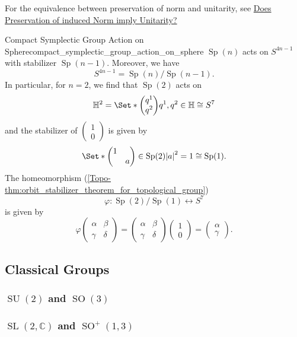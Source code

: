 \documentclass{article}
\begin{document}
For the equivalence between preservation of norm and unitarity, see \href{https://math.stackexchange.com/questions/3313702/does-preservation-of-induced-norm-imply-unitarity}{Does Preservation of induced Norm imply Unitarity?}

\begin{example}{Compact Symplectic Group Action on Sphere}{compact_symplectic_group_action_on_sphere}
    $\operatorname{Sp}(n)$ acts on $S^{4n-1}$ with stabilizer $\operatorname{Sp}(n-1)$.
    Moreover, we have
    \[ S^{4n-1} = \operatorname{Sp}(n)/\operatorname{Sp}(n-1). \]
    In particular, for $n=2$, we find that $\operatorname{Sp}(2)$ acts on
    \[ \mathbb{H}^2 = \Set*{\begin{pmatrix}
        q^1 \\ q^2
    \end{pmatrix}}{q^1,q^2\in\mathbb{H}} \cong S^7 \]
    and the stabilizer of $\begin{pmatrix}
        1 \\ 0
    \end{pmatrix}$ is given by
    \[ \Set*{\begin{pmatrix}
        1 & \\ & a
    \end{pmatrix}\in\operatorname{Sp}(2)}{\abs{a}^2 = 1} \cong \operatorname{Sp}(1). \]
    The homeomorphism (\cref{Topo-thm:orbit_stabilizer_theorem_for_topological_group})
    \[ \varphi: \operatorname{Sp}(2)/\operatorname{Sp}(1) \longleftrightarrow S^7 \]
    is given by
    \[ \varphi\begin{pmatrix}
        \alpha & \beta \\ \gamma & \delta
    \end{pmatrix} = \begin{pmatrix}
        \alpha & \beta \\ \gamma & \delta
    \end{pmatrix} \begin{pmatrix}
        1 \\ 0
    \end{pmatrix} = \begin{pmatrix}
        \alpha \\ \gamma
    \end{pmatrix}. \]
\end{example}

\subsection{Classical Groups}

\subsubsection{\texorpdfstring{$\operatorname{SU}(2)$ and $\operatorname{SO}(3)$}{SU(2) and SO(3)}}

\subsubsection{\texorpdfstring{$\operatorname{SL}(2,\mathbb{C})$ and $\operatorname{SO}^+(1,3)$}{SL(2) and SO+(1,3)}}

% 
% 
\end{document}

